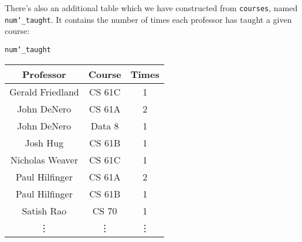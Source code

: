 There's also an additional table which we have constructed from
\texttt{courses}, named \texttt{num\char`_taught}. It contains the number of
times each professor has taught a given course:

\begin{center}
    \texttt{num\char`_taught}\\
    \begin{tabular}{ c c c }
        \textbf{Professor} & \textbf{Course} & \textbf{Times} \\
        \hline
        Gerald Friedland & CS 61C & 1\\
        John DeNero      & CS 61A & 2\\
        John DeNero      & Data 8 & 1\\
        Josh Hug         & CS 61B & 1\\
        Nicholas Weaver  & CS 61C & 1\\
        Paul Hilfinger   & CS 61A & 2\\
        Paul Hilfinger   & CS 61B & 1\\
        Satish Rao       & CS 70  & 1\\
        \vdots           & \vdots & \vdots
    \end{tabular}
\end{center}
